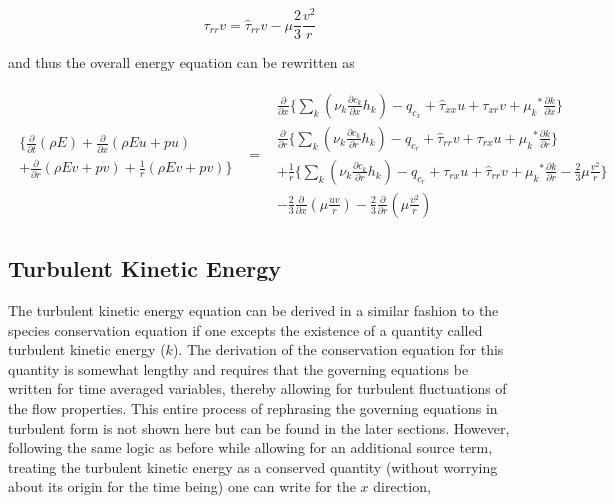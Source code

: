 \begin{displaymath}
	\tau_{rr}v = \hat \tau_{rr} v - \mu \frac{2}{3} \frac {v^2}{r}
\end{displaymath}

	and thus the overall energy equation can be rewritten as

\begin{equation}
	\begin{array}{ccc}
		\begin{array}{c}
		\Big\{\frac{\partial}{\partial t}(\rho E) +\frac{\partial}{\partial x}(\rho E u + pu) \\
		+ \frac{\partial}{\partial r}(\rho E v + pv) + \frac{1}{r}(\rho E v + pv)\Big\}
		\end{array} & = &
		\begin{array}{c}
			\frac{\partial}{\partial x}\Big\{
			\sum_k (\nu_k \frac{\partial c_k}{\partial x}h_k) 
			- q_{c_x} +  \hat \tau_{xx}u + \tau_{xr}v + {\mu_k}^* \frac{\partial k}{\partial x}\Big\} \\
			\frac{\partial}{\partial r}\Big\{
			\sum_k (\nu_k \frac{\partial c_k}{\partial r}h_k)
			-  q_{c_r} + \hat \tau_{rr}v + \tau_{rx}u + {\mu_k}^* \frac{\partial k}{\partial r}\Big\} \\
			+\frac{1}{r}\Big\{\sum_k (\nu_k \frac{\partial c_k}{\partial r}h_k) - q_{c_r} + \tau_{rx}u 
			+ \hat \tau_{rr}v + {\mu_k}^* \frac{\partial k}{\partial r} - \frac{2}{3} \mu \frac{v^2}{r}\Big\} \\
			- \frac{2}{3} \frac{\partial}{\partial x}(\mu \frac{uv}{r})
			- \frac{2}{3} \frac{\partial}{\partial r}(\mu \frac{v^2}{r}) 
		\end{array}  
	\end{array}
\label{eqn:energy}
\end{equation}

\subsection{Turbulent Kinetic Energy}

	The turbulent kinetic energy equation can be derived in a similar fashion to the species conservation
equation if one excepts the existence of a quantity called turbulent kinetic energy ($k$).  The derivation of the conservation
equation for this quantity is somewhat lengthy and requires that the governing equations be written for time averaged variables,
thereby allowing for turbulent fluctuations of the flow properties.  This entire process of rephrasing the governing equations
in turbulent form is not shown here but can be found in the later sections.  However, following the same logic as before while 
allowing for an additional source term, treating the turbulent kinetic energy as a conserved quantity (without worrying about
its origin for the time being) one can write for the $x$ direction,

